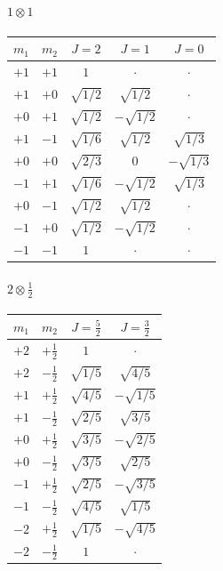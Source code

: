 \documentclass[11pt]{article}
\theoremstyle{plain}
\theoremstyle{definition}
\theoremstyle{remark}
\begin{document}
\paragraph{$1 \otimes 1$}
\begin{center}
\begin{tabular}{cc|ccc}
\toprule
$m_1$ & $m_2$ & $J=2$ & $J=1$ & $J=0$ \\
\midrule
$+1$ & $+1$ & $1$ & $\cdot$ & $\cdot$ \\
\midrule
$+1$ & $+0$ & $\sqrt{1/2}$ & $\sqrt{1/2}$ & $\cdot$ \\
$+0$ & $+1$ & $\sqrt{1/2}$ & $-\sqrt{1/2}$ & $\cdot$ \\
\midrule
$+1$ & $-1$ & $\sqrt{1/6}$ & $\sqrt{1/2}$ & $\sqrt{1/3}$ \\
$+0$ & $+0$ & $\sqrt{2/3}$ & $0$ & $-\sqrt{1/3}$ \\
$-1$ & $+1$ & $\sqrt{1/6}$ & $-\sqrt{1/2}$ & $\sqrt{1/3}$ \\
\midrule
$+0$ & $-1$ & $\sqrt{1/2}$ & $\sqrt{1/2}$ & $\cdot$ \\
$-1$ & $+0$ & $\sqrt{1/2}$ & $-\sqrt{1/2}$ & $\cdot$ \\
\midrule
$-1$ & $-1$ & $1$ & $\cdot$ & $\cdot$ \\
\bottomrule
\end{tabular}
\end{center}

\paragraph{$2 \otimes \tfrac12$}
\begin{center}
\begin{tabular}{cc|cc}
\toprule
$m_1$ & $m_2$ & $J=\tfrac{5}{2}$ & $J=\tfrac{3}{2}$ \\
\midrule
$+2$ & $+\tfrac{1}{2}$ & $1$ & $\cdot$ \\
\midrule
$+2$ & $-\tfrac{1}{2}$ & $\sqrt{1/5}$ & $\sqrt{4/5}$ \\
$+1$ & $+\tfrac{1}{2}$ & $\sqrt{4/5}$ & $-\sqrt{1/5}$ \\
\midrule
$+1$ & $-\tfrac{1}{2}$ & $\sqrt{2/5}$ & $\sqrt{3/5}$ \\
$+0$ & $+\tfrac{1}{2}$ & $\sqrt{3/5}$ & $-\sqrt{2/5}$ \\
\midrule
$+0$ & $-\tfrac{1}{2}$ & $\sqrt{3/5}$ & $\sqrt{2/5}$ \\
$-1$ & $+\tfrac{1}{2}$ & $\sqrt{2/5}$ & $-\sqrt{3/5}$ \\
\midrule
$-1$ & $-\tfrac{1}{2}$ & $\sqrt{4/5}$ & $\sqrt{1/5}$ \\
$-2$ & $+\tfrac{1}{2}$ & $\sqrt{1/5}$ & $-\sqrt{4/5}$ \\
\midrule
$-2$ & $-\tfrac{1}{2}$ & $1$ & $\cdot$ \\
\bottomrule
\end{tabular}
\end{center}
\end{document}
